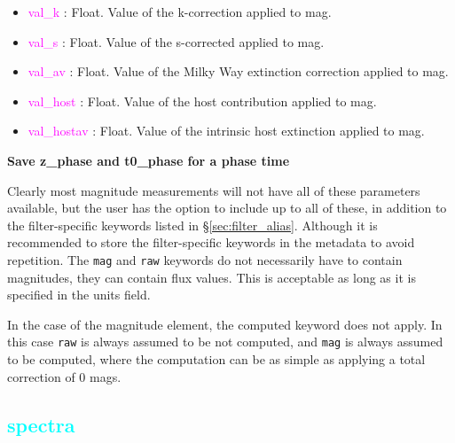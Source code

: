\documentclass[tighten]{aastex631}
\newcommand{\property}[1]{\textcolor{cyan}{#1}}
\newcommand{\keyword}[1]{\textcolor{magenta}{#1}}
\begin{document}
\begin{itemize}
    \item \keyword{val\_k} : Float. Value of the k-correction applied to mag.
    \item \keyword{val\_s} : Float. Value of the s-corrected applied to mag.
    \item \keyword{val\_av} : Float. Value of the Milky Way extinction correction applied to mag.
    \item \keyword{val\_host} : Float. Value of the host contribution applied to mag.
    \item \keyword{val\_hostav} : Float. Value of the intrinsic host extinction applied to mag.
\end{itemize}

\textbf{Save z\_phase and t0\_phase for a phase time}

Clearly most magnitude measurements will not have all of these parameters available, but the user has the option to include up to all of these, in addition to the filter-specific keywords listed in \S\ref{sec:filter_alias}. Although it is recommended to store the filter-specific keywords in the metadata to avoid repetition. The {\tt mag} and {\tt raw} keywords do not necessarily have to contain magnitudes, they can contain flux values. This is acceptable as long as it is specified in the units field.

In the case of the magnitude element, the computed keyword does not apply. In this case {\tt raw} is always assumed to be not computed, and {\tt mag} is always assumed to be computed, where the computation can be as simple as applying a total correction of 0 mags.

\subsection{\property{spectra}} \label{sec:spectra}
\end{document}
